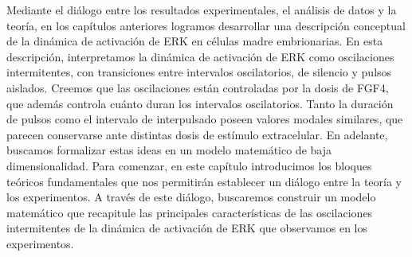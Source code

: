 \documentclass[./main.tex]{subfiles}
\begin{document}
Mediante el diálogo entre los resultados experimentales, el análisis de datos y la teoría, en los capítulos anteriores logramos desarrollar una descripción conceptual de la dinámica de activación de ERK en células madre embrionarias. En esta descripción, interpretamos la dinámica de activación de ERK como oscilaciones intermitentes, con transiciones entre intervalos oscilatorios, de silencio y pulsos aislados. Creemos que las oscilaciones están controladas por la dosis de FGF4, que además controla cuánto duran los intervalos oscilatorios. Tanto la duración de pulsos como el intervalo de interpulsado poseen valores modales similares, que parecen conservarse ante distintas dosis de estímulo extracelular. En adelante, buscamos formalizar estas ideas en un modelo matemático de baja dimensionalidad. Para comenzar, en este capítulo introducimos los bloques teóricos fundamentales que nos permitirán establecer un diálogo entre la teoría y los experimentos. A través de este diálogo, buscaremos construir un modelo matemático que recapitule las principales características de las oscilaciones intermitentes de la dinámica de activación de ERK que observamos en los experimentos. 
\end{document}
